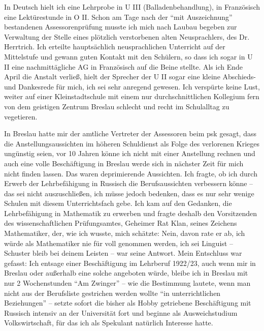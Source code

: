 In Deutsch hielt ich eine Lehrprobe in U III (Balladenbehandlung), in Französisch eine Lektürestunde in O II. Schon am Tage nach der \enquote{mit Auszeichnung} bestandenen Assessorenprüfung musste ich mich nach Laubau begeben zur Verwaltung der Stelle eines plötzlich verstorbenen alten Neusprachlers, des Dr. Herrtrich. Ich erteilte hauptsächlich neusprachlichen Unterricht auf der Mittelstufe und gewann guten Kontakt mit den Schülern, so dass ich sogar in U II eine nachmittägliche AG in Französisch auf die Beine stellte. Als ich Ende April die Anstalt verließ, hielt der Sprecher der U II sogar eine kleine Abschieds- und Dankesrede für mich, ich sei sehr anregend gewesen. Ich verspürte keine Lust, weiter auf einer Kleinstadtschule mit einem nur durchschnittlichen Kollegium fern von dem geistigen Zentrum Breslau schlecht und recht im Schulalltag zu vegetieren.

In Breslau hatte mir der amtliche Vertreter der Assessoren beim \ac{psk} gesagt, dass die Anstellungsaussichten im höheren Schuldienst als Folge des verlorenen Krieges ungünstig seien, vor 10 Jahren könne ich nicht mit einer Anstellung rechnen und auch eine volle Beschäftigung in Breslau werde sich in nächster Zeit für mich nicht finden lassen.  Das waren deprimierende Aussichten. Ich fragte, ob ich durch Erwerb der Lehrbefähigung in Russisch die Berufsaussichten verbessern könne -- das sei nicht auszuschließen, ich müsse jedoch bedenken, dass es nur sehr wenige Schulen mit diesem Unterrichtsfach gebe. Ich kam auf den Gedanken, die Lehrbefähigung in Mathematik zu erwerben und fragte deshalb den Vorsitzenden des wissenschaftlichen Prüfungsamtes, Geheimer Rat Klan, seines Zeichens Mathematiker, der, wie ich wusste, mich schätzte: Nein, davon rate er ab, ich würde als Mathematiker nie für voll genommen werden, ich sei Linguist -- Schuster bleib bei deinem Leisten -- war seine Antwort. Mein Entschluss war gefasst: Ich entsage einer Beschäftigung im Lehrberuf 1922/23, auch wenn mir in Breslau oder außerhalb eine solche angeboten würde, bleibe ich in Breslau mit nur 2 Wochenstunden \enquote{Am Zwinger} -- wie die Bestimmung lautete, wenn man nicht aus der Berufsliste gestrichen werden wollte \enquote{in unterrichtlichen Beziehungen} -- setzte sofort die bisher als Hobby getriebene Beschäftigung mit Russisch intensiv an der Universität fort und beginne als Ausweichstudium Volkswirtschaft, für das ich als Spekulant natürlich Interesse hatte.

